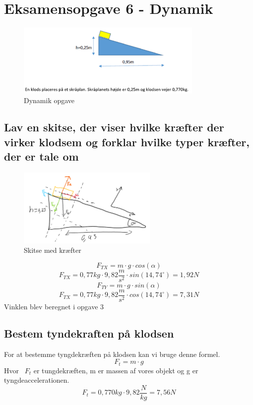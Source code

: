 \newpage
\section{Eksamensopgave 6 - Dynamik}
\begin{figure}[h!]
    \centering
    \includegraphics[width=0.8\textwidth]{figures/dynamik.png}
    \caption{Dynamik opgave}
\end{figure}
\subsection{Lav en skitse, der viser hvilke kræfter der virker klodsem og forklar hvilke typer kræfter, der er tale om}
\begin{figure}[h!]
    \centering
    \includegraphics[width=0.6\textwidth]{figures/dynamikskitse.png}
    \caption{Skitse med kræfter}
\end{figure}
\begin{equation*}
    F_{TX} = m \cdot g \cdot cos(\alpha)
\end{equation*}
\begin{equation*}
    F_{TX} = 0,77kg \cdot 9,82\frac{m}{s^{2}} \cdot sin(14,74^{\circ}) = 1,92N
\end{equation*}
\begin{equation*}
    F_{TY} = m \cdot g \cdot sin(\alpha)
\end{equation*}
\begin{equation*}
    F_{TX} = 0,77kg \cdot 9,82\frac{m}{s^{2}} \cdot cos(14,74^{\circ}) = 7,31N
\end{equation*}
Vinklen blev beregnet i opgave 3
\subsection{Bestem tyndekraften på klodsen}
For at bestemme tyngdekræften på klodsen kan vi bruge denne formel.
\begin{equation*}
    F_{t} = m \cdot g
\end{equation*}
Hvor ~$F_{t}$ er tungdekræften, m er massen af vores objekt og g er tyngdeaccelerationen.
\begin{equation*}
    F_{t} = 0,770kg \cdot 9,82\frac{N}{kg} = 7,56N
\end{equation*}
